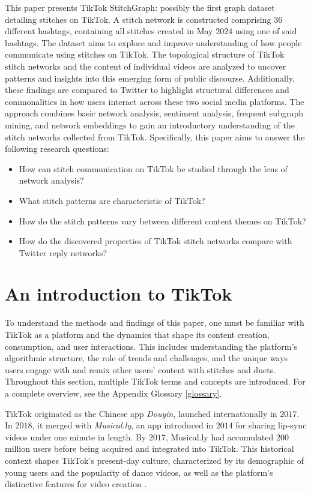 This paper presents TikTok StitchGraph: possibly the first graph dataset detailing stitches on TikTok. A stitch network is constructed comprising $36$ different hashtags, containing all stitches created in May $2024$ using one of said hashtags. The dataset aims to explore and improve understanding of how people communicate using stitches on TikTok. The topological structure of TikTok stitch networks and the content of individual videos are analyzed to uncover patterns and insights into this emerging form of public discourse. Additionally, these findings are compared to Twitter to highlight structural differences and commonalities in how users interact across these two social media platforms. The approach combines basic network analysis, sentiment analysis, frequent subgraph mining, and network embeddings to gain an introductory understanding of the stitch networks collected from TikTok. Specifically, this paper aims to answer the following research questions:

\begin{itemize}
    \item How can stitch communication on TikTok be studied through the lens of network analysis?
    \item What stitch patterns are characteristic of TikTok?
    \item How do the stitch patterns vary between different content themes on TikTok?
    \item How do the discovered properties of TikTok stitch networks compare with Twitter reply networks?
\end{itemize}


\section{An introduction to TikTok}
To understand the methods and findings of this paper, one must be familiar with TikTok as a platform and the dynamics that shape its content creation, consumption, and user interactions. This includes understanding the platform's algorithmic structure, the role of trends and challenges, and the unique ways users engage with and remix other users' content with stitches and duets. Throughout this section, multiple TikTok terms and concepts are introduced. For a complete overview, see the Appendix Glossary \ref{glossary}.

TikTok originated as the Chinese app \textit{Douyin}, launched internationally in $2017$. In $2018$, it merged with \textit{Musical.ly}, an app introduced in $2014$ for sharing lip-sync videos under one minute in length. By $2017$, Musical.ly had accumulated $200$ million users before being acquired and integrated into TikTok. This historical context shapes TikTok’s present-day culture, characterized by its demographic of young users and the popularity of dance videos, as well as the platform's distinctive features for video creation \citep{IJoC14543}.


